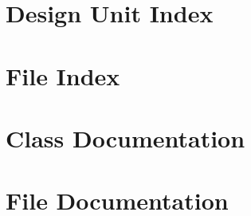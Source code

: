 \documentclass[12p,english]{report}
\begin{document}

\section*{Design Unit Index}

\section*{File Index}

\section*{Class Documentation}
































\section*{File Documentation}
















\newpage
{}
{}
\printindex
\end{document}
